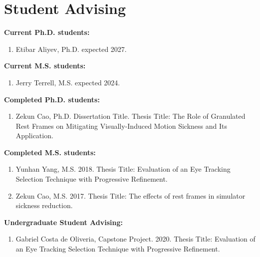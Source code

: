 \documentclass[wideaddress]{vitae}
\let\olditem\item
\def\item{\nopagebreak[4]\olditem}%
\newcommand{\resitem}[1]{
	\item \begin{flushleft} #1 \end{flushleft}
}
\newenvironment{resnumberedlist}[1]{
	\resitem{\textbf{#1}}
	\begin{enumerate}
}{
	\end{enumerate}
}
\begin{document}
\section{Student Advising}
\begin{description}
	\begin{resnumberedlist}{Current Ph.D. students:}
	\resitem{Etibar Aliyev, Ph.D. expected 2027.}
	\end{resnumberedlist}

	\begin{resnumberedlist}{Current M.S. students:}
	\resitem{Jerry Terrell, M.S. expected 2024.}
	\end{resnumberedlist}

	\begin{resnumberedlist}{Completed Ph.D. students:}
	\resitem{Zekun Cao, Ph.D. Dissertation Title. Thesis Title: The Role of Granulated Rest Frames on Mitigating Visually-Induced Motion Sickness and Its Application.}
	\end{resnumberedlist}

	\begin{resnumberedlist}{Completed M.S. students:}
	\resitem{Yunhan Yang, M.S. 2018. Thesis Title: Evaluation of an Eye Tracking Selection Technique with Progressive Refinement.}
	\resitem{Zekun Cao, M.S. 2017. Thesis Title: The effects of rest frames in simulator sickness reduction.}
	\end{resnumberedlist}
	
	\begin{resnumberedlist}{Undergraduate Student Advising:}
	\resitem{Gabriel Costa de Oliveria, Capstone Project. 2020. Thesis Title: Evaluation of an Eye Tracking Selection Technique with Progressive Refinement.}
	\end{resnumberedlist}
	

\end{description}
\end{document}
